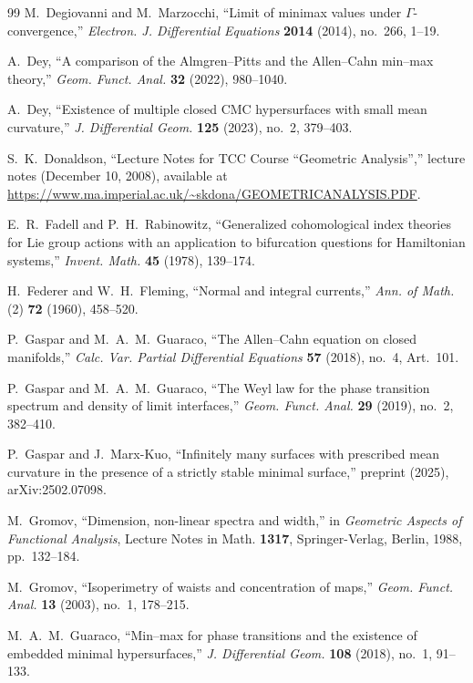 \documentclass[12pt,english]{article}
\theoremstyle{definition}
\begin{document}
\begin{thebibliography}{99}
 M.~Degiovanni and M.~Marzocchi, ``Limit of minimax values under $\Gamma$-convergence,'' \textit{Electron. J. Differential Equations} \textbf{2014} (2014), no.~266, 1--19.

 A.~Dey, ``A comparison of the Almgren--Pitts and the Allen--Cahn min--max theory,'' \textit{Geom. Funct. Anal.} \textbf{32} (2022), 980--1040.

 A.~Dey, ``Existence of multiple closed CMC hypersurfaces with small mean curvature,'' \textit{J. Differential Geom.} \textbf{125} (2023), no.~2, 379--403.

 S.~K.~Donaldson, ``Lecture Notes for TCC Course ``Geometric Analysis'','' lecture notes (December 10, 2008), available at \url{https://www.ma.imperial.ac.uk/~skdona/GEOMETRICANALYSIS.PDF}.

 E.~R.~Fadell and P.~H.~Rabinowitz, ``Generalized cohomological index theories for Lie group actions with an application to bifurcation questions for Hamiltonian systems,'' \textit{Invent. Math.} \textbf{45} (1978), 139--174.

 H.~Federer and W.~H.~Fleming, ``Normal and integral currents,'' \textit{Ann. of Math.} (2) \textbf{72} (1960), 458--520.

 P.~Gaspar and M.~A.~M.~Guaraco, ``The Allen--Cahn equation on closed manifolds,'' \textit{Calc. Var. Partial Differential Equations} \textbf{57} (2018), no.~4, Art.~101.

 P.~Gaspar and M.~A.~M.~Guaraco, ``The Weyl law for the phase transition spectrum and density of limit interfaces,'' \textit{Geom. Funct. Anal.} \textbf{29} (2019), no.~2, 382--410.

 P.~Gaspar and J.~Marx-Kuo, ``Infinitely many surfaces with prescribed mean curvature in the presence of a strictly stable minimal surface,'' preprint (2025), arXiv:2502.07098.

 M.~Gromov, ``Dimension, non-linear spectra and width,'' in \textit{Geometric Aspects of Functional Analysis}, Lecture Notes in Math. \textbf{1317}, Springer-Verlag, Berlin, 1988, pp.~132--184.

 M.~Gromov, ``Isoperimetry of waists and concentration of maps,'' \textit{Geom. Funct. Anal.} \textbf{13} (2003), no.~1, 178--215.

 M.~A.~M.~Guaraco, ``Min--max for phase transitions and the existence of embedded minimal hypersurfaces,'' \textit{J. Differential Geom.} \textbf{108} (2018), no.~1, 91--133.


\end{thebibliography}
\end{document}
